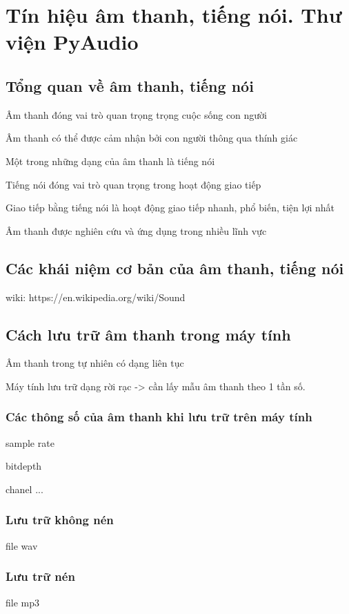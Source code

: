 \chapter{Tín hiệu âm thanh, tiếng nói. Thư viện PyAudio}
\ifpdf
    \graphicspath{{Chapter2/Chapter2Figs/PNG/}{Chapter2/Chapter2Figs/PDF/}{Chapter2/Chapter2Figs/}}
\else
    \graphicspath{{Chapter2/Chapter2Figs/EPS/}{Chapter2/Chapter2Figs/}}
\fi

\section{Tổng quan về âm thanh, tiếng nói}
Âm thanh đóng vai trò quan trọng trọng cuộc sống con người

Âm thanh có thể được cảm nhận bởi con người thông qua thính giác

Một trong những dạng của âm thanh là tiếng nói

Tiếng nói đóng vai trò quan trọng trong hoạt động giao tiếp

Giao tiếp bằng tiếng nói là hoạt động giao tiếp nhanh, phổ biến, tiện lợi nhất

Âm thanh được nghiên cứu và ứng dụng trong nhiều lĩnh vực
\section{Các khái niệm cơ bản của âm thanh, tiếng nói}
wiki: https://en.wikipedia.org/wiki/Sound
\section{Cách lưu trữ âm thanh trong máy tính}
Âm thanh trong tự nhiên có dạng liên tục 

Máy tính lưu trữ dạng rời rạc -> cần lấy mẫu âm thanh theo 1 tần số.
\subsection{Các thông số của âm thanh khi lưu trữ trên máy tính}
sample rate

bitdepth

chanel
...
\subsection{Lưu trữ không nén}
file wav
\subsection{Lưu trữ nén}
file mp3

